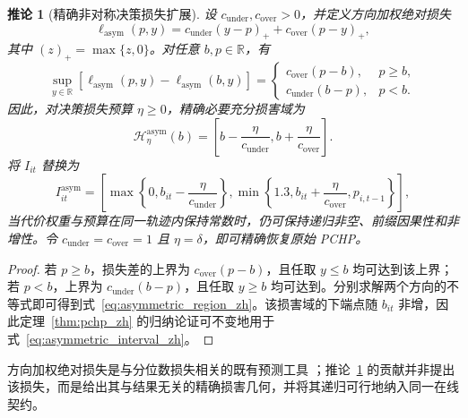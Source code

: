 \documentclass[UTF8,11pt]{ctexart}
\newtheorem{corollary}{推论}
\newcommand{\R}{\mathbb{R}}
\begin{document}
\begin{corollary}[精确非对称决策损失扩展]
\label{cor:asymmetric_zh}
设 $c_{\mathrm{under}},c_{\mathrm{over}}>0$，并定义方向加权绝对损失
\begin{equation}
  \ell_{\mathrm{asym}}(p,y)
  =c_{\mathrm{under}}(y-p)_{+}
  +c_{\mathrm{over}}(p-y)_{+},
  \label{eq:asymmetric_loss_zh}
\end{equation}
其中 $(z)_{+}=\max\{z,0\}$。对任意 $b,p\in\R$，有
\begin{equation}
  \sup_{y\in\R}\!\left[
  \ell_{\mathrm{asym}}(p,y)-\ell_{\mathrm{asym}}(b,y)
  \right]
  =
  \begin{cases}
    c_{\mathrm{over}}(p-b), & p\geq b,\\
    c_{\mathrm{under}}(b-p), & p<b.
  \end{cases}
  \label{eq:asymmetric_identity_zh}
\end{equation}
因此，对决策损失预算 $\eta\geq0$，精确必要充分损害域为
\begin{equation}
  \mathcal H^{\mathrm{asym}}_{\eta}(b)
  =\left[b-\frac{\eta}{c_{\mathrm{under}}},
          b+\frac{\eta}{c_{\mathrm{over}}}\right].
  \label{eq:asymmetric_region_zh}
\end{equation}
将 $I_{it}$ 替换为
\begin{equation}
  I^{\mathrm{asym}}_{it}
  =\left[
  \max\!\left\{0,b_{it}-\frac{\eta}{c_{\mathrm{under}}}\right\},
  \min\!\left\{1.3,b_{it}+\frac{\eta}{c_{\mathrm{over}}},p_{i,t-1}\right\}
  \right],
  \label{eq:asymmetric_interval_zh}
\end{equation}
当代价权重与预算在同一轨迹内保持常数时，仍可保持递归非空、前缀因果性和非增性。令 $c_{\mathrm{under}}=c_{\mathrm{over}}=1$ 且 $\eta=\delta$，即可精确恢复原始 PCHP。
\end{corollary}
\begin{proof}
若 $p\geq b$，损失差的上界为 $c_{\mathrm{over}}(p-b)$，且任取 $y\leq b$ 均可达到该上界；若 $p<b$，上界为 $c_{\mathrm{under}}(b-p)$，且任取 $y\geq b$ 均可达到。分别求解两个方向的不等式即可得到式~\eqref{eq:asymmetric_region_zh}。该损害域的下端点随 $b_{it}$ 非增，因此定理~\ref{thm:pchp_zh} 的归纳论证可不变地用于式~\eqref{eq:asymmetric_interval_zh}。
\end{proof}

方向加权绝对损失是与分位数损失相关的既有预测工具 \citep{koenker1978regression}；推论~\ref{cor:asymmetric_zh} 的贡献并非提出该损失，而是给出其与结果无关的精确损害几何，并将其递归可行地纳入同一在线契约。
\end{document}
